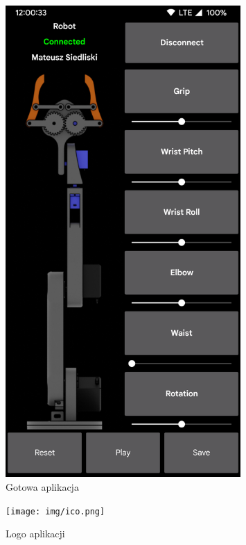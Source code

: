 \documentclass[11pt,titlepage,a4paper]{article}
\begin{document}
\begin{figure}[p]
    \begin{center}
        \includegraphics[width=0.8\textwidth]{img/app.png}
    \end{center}
    \caption{Gotowa aplikacja}
    \label{FinalApp}
\end{figure}

\begin{figure}[p]
    \begin{center}
        \texttt{[image: img/ico.png]}
    \end{center}
    \caption{Logo aplikacji}
    \label{logoapp}
\end{figure}
\end{document}
